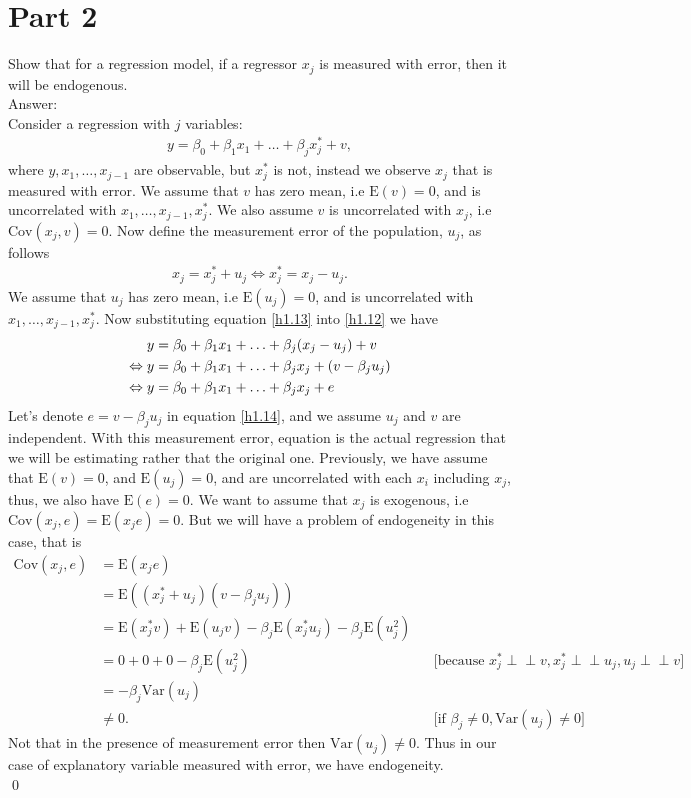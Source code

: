 \documentclass[10pt]{article}
\newcommand{\E}{\text{E}}
\newcommand{\V}{\text{Var}}
\newcommand{\cov}{\text{Cov}}
\newcommand{\indep}{\perp \!\!\! \perp}
\begin{document}
\section*{Part 2}
Show that for a regression model, if a regressor $x_j$ is measured with error, then it will be endogenous.
\\ Answer: \\
Consider a regression with $j$ variables:
\begin{align}
    y=\beta_0+\beta_1x_1+\ldots+\beta_jx_j^*+v,\label{h1.12}
\end{align}
where $y,x_1,\ldots,x_{j-1}$ are observable, but $x_j^*$ is not, instead we observe $x_j$ that is measured with error. We assume that $v$ has zero mean, i.e $\E(v)=0$, and is uncorrelated with $x_1,\ldots,x_{j-1},x_j^*$. We also assume $v$ is uncorrelated with $x_j$, i.e $\cov(x_j,v)=0$. Now define the measurement error of the population, $u_j$, as follows
\begin{align}
x_j=x_j^*+u_j\Leftrightarrow x_j^*=x_j-u_j.\label{h1.13}
\end{align}
We assume that $u_j$ has zero mean, i.e $\E(u_j)=0$, and is uncorrelated with $x_1,\ldots,x_{j-1},x_j^*$. Now substituting equation \eqref{h1.13} into \eqref{h1.12} we have
\begin{align}
    y&=\beta_0+\beta_1x_1+\ldots+\beta_j(x_j-u_j)+v \notag \\
    \Leftrightarrow y&=\beta_0+\beta_1x_1+\ldots+\beta_jx_j+(v-\beta_ju_j) \label{h1.14} \\
    \Leftrightarrow y&=\beta_0+\beta_1x_1+\ldots+\beta_jx_j+e \notag
\end{align}
Let's denote $e=v-\beta_ju_j$ in equation \eqref{h1.14}, and we assume $u_j$ and $v$ are independent. With this measurement error, equation is the actual regression that we will be estimating rather that the original one. Previously, we have assume that $\E(v)=0$, and $\E(u_j)=0$, and are uncorrelated with each $x_i$ including $x_j$, thus, we also have $\E(e)=0$. We want to assume that $x_j$ is exogenous, i.e $\cov(x_j,e)=\E(x_je)=0$. But we will have a problem of endogeneity in this case, that is
\begin{align*}
    \cov(x_j,e)&=\E(x_je)\\
    &=\E((x_j^*+u_j)(v-\beta_ju_j))\\
    &=\E(x_j^*v)+\E(u_jv)-\beta_j\E(x_j^*u_j)-\beta_j\E(u_j^2)\\
    &=0+0+0-\beta_j\E(u_j^2)& &\text{[because }x_j^*\indep v,x_j^*\indep u_j, u_j\indep v]\\
    &=-\beta_j\V(u_j) \\
    &\neq 0.& &\text{[if }\beta_j\neq0, \V(u_j)\neq0]
\end{align*}
Not that in the presence of measurement error then $\V(u_j)\neq0$. Thus in our case of explanatory variable measured with error, we have endogeneity.\\
\qed
\end{document}
